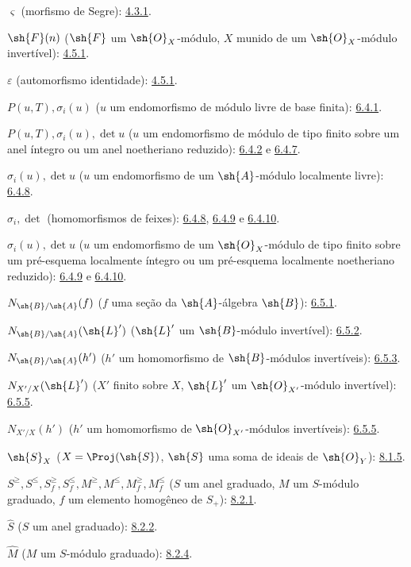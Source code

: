 \documentclass[oneside,10pt]{amsart}
\renewcommand{\leq}{\leqslant}
\renewcommand{\geq}{\geqslant}
\begin{document}
$\varsigma$ (morfismo de Segre): \hyperref[II.4.3.1]{4.3.1}.

$\sh{F}(n)$ ($\sh{F}$ um $\sh{O}_X$-módulo, $X$ munido de um
$\sh{O}_X$-módulo invertível): \hyperref[II.4.5.1]{4.5.1}.

$\varepsilon$ (automorfismo identidade): \hyperref[II.4.5.1]{4.5.1}.

$P(u,T),\sigma_i(u)$ ($u$ um endomorfismo de módulo livre de base finita): \hyperref[II.6.4.1]{6.4.1}.

$P(u,T),\sigma_i(u),\det u$
($u$ um endomorfismo de módulo de tipo finito sobre um anel íntegro ou um
anel noetheriano reduzido): \hyperref[II.6.4.2]{6.4.2} e \hyperref[II.6.4.7]{6.4.7}.

$\sigma_i(u),\det u$ ($u$ um endomorfismo de um $\sh{A}$-módulo localmente livre): \hyperref[II.6.4.8]{6.4.8}.

$\sigma_i,\det$ (homomorfismos de feixes): \hyperref[II.6.4.8]{6.4.8}, \hyperref[II.6.4.9]{6.4.9} e \hyperref[II.6.4.10]{6.4.10}.

$\sigma_i(u),\det u$
($u$ um endomorfismo de um $\sh{O}_X$-módulo de tipo finito sobre um pré-esquema
localmente íntegro ou um pré-esquema localmente noetheriano reduzido):
\hyperref[II.6.4.9]{6.4.9} e \hyperref[II.6.4.10]{6.4.10}.

$N_{\sh{B}/\sh{A}}(f)$
($f$ uma seção da $\sh{A}$-álgebra $\sh{B}$): \hyperref[II.6.5.1]{6.5.1}.

$N_{\sh{B}/\sh{A}}(\sh{L}')$
($\sh{L}'$ um $\sh{B}$-módulo invertível): \hyperref[II.6.5.2]{6.5.2}.

$N_{\sh{B}/\sh{A}}(h')$
($h'$ um homomorfismo de $\sh{B}$-módulos invertíveis): \hyperref[II.6.5.3]{6.5.3}.

$N_{X'/X}(\sh{L}')$
($X'$ finito sobre $X$, $\sh{L}'$ um $\sh{O}_{X'}$-módulo invertível): \hyperref[II.6.5.5]{6.5.5}.

$N_{X'/X}(h')$
($h'$ um homomorfismo de $\sh{O}_{X'}$-módulos invertíveis): \hyperref[II.6.5.5]{6.5.5}.

$\sh{S}_X$ ($X=\Proj(\sh{S})$, $\sh{S}$ uma soma de ideais de
$\sh{O}_Y$): \hyperref[II.8.1.5]{8.1.5}.

$S^\geq,S^\leq,S_f^\geq,S_f^\leq,
M^\geq,M^\leq,M_f^\geq,M_f^\leq$
($S$ um anel graduado, $M$ um $S$-módulo graduado,
$f$ um elemento homogêneo de $S_+$): \hyperref[II.8.2.1]{8.2.1}.

$\widehat S$ ($S$ um anel graduado): \hyperref[II.8.2.2]{8.2.2}.

$\widehat M$ ($M$ um $S$-módulo graduado): \hyperref[II.8.2.4]{8.2.4}.
\end{document}
